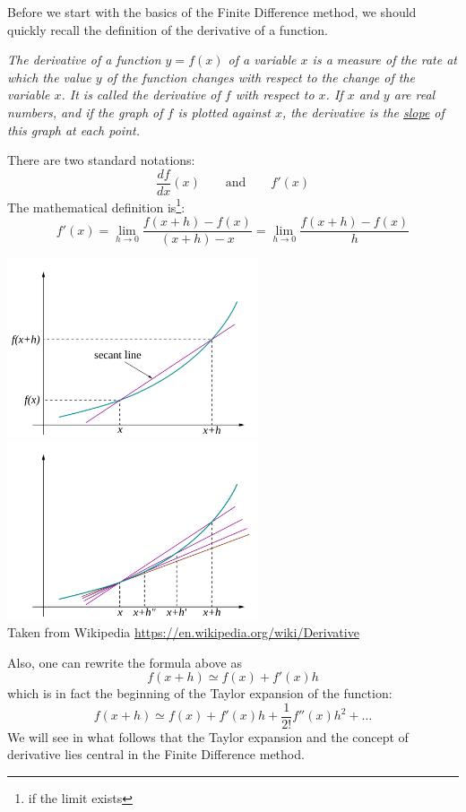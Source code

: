 Before we start with the basics of the Finite Difference method, we should quickly recall the definition 
of the derivative of a function. 

\begin{center}
{\sl 
The derivative of a function $y=f(x)$ of a variable $x$ is a measure of the rate at which the value $y$ 
of the function changes with respect to the change of the variable $x$. It is called the derivative of $f$ 
with respect to $x$. If $x$ and $y$ are real numbers, and if the graph of $f$ is plotted against $x$, the derivative 
is the \underline{slope} of this graph at each point. 
}
\end{center}

\noindent There are two standard notations:
\[
\frac{df}{dx}(x) \qquad \text{and} \qquad f'(x)
\]
The mathematical definition is\footnote{if the limit exists}:
\[
\boxed{
f'(x)
=\lim_{h\rightarrow 0} \frac{f(x+h)-f(x)}{(x+h)-x} 
=\lim_{h\rightarrow 0} \frac{f(x+h)-f(x)}{h} 
}
\]

\begin{center}
\includegraphics[width=7.4cm]{images/derivative/der2}
\includegraphics[width=7.4cm]{images/derivative/der1}\\
{\captionfont Taken from Wikipedia \url{https://en.wikipedia.org/wiki/Derivative}}
\end{center}

Also, one can rewrite the formula above as
\[
f(x+h) \simeq f(x) +  f'(x) h
\]
which is in fact the beginning of the Taylor expansion of the function:
\[
f(x+h) \simeq f(x) +  f'(x) h + \frac{1}{2!} f''(x) h^2 + \dots 
\]
We will see in what follows that the Taylor expansion and the concept of derivative lies 
central in the Finite Difference method. 

